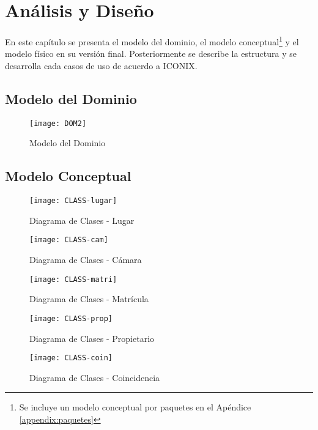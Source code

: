 \chapter{Análisis y Diseño}
En este capítulo se presenta el modelo del dominio, el modelo conceptual\footnote{Se incluye un modelo conceptual por paquetes en el Apéndice \ref{appendix:paquetes}} y el modelo físico en su versión final. Posteriormente se describe la estructura y se desarrolla cada casos de uso de acuerdo a ICONIX.

\pagebreak
\section{Modelo del Dominio}
    \begin{figure}[H]
        \centering
        \texttt{[image: DOM2]}
        \caption{Modelo del Dominio}
        \label{fig:DOM}
    \end{figure}
\section{Modelo Conceptual}

 \begin{figure}[H]
        \centering
        \texttt{[image: CLASS-lugar]}
        \caption{Diagrama de Clases - Lugar}
        \label{fig:class-lugar}
    \end{figure}
 \begin{figure}[H]
        \centering
        \texttt{[image: CLASS-cam]}
        \caption{Diagrama de Clases - Cámara}
        \label{fig:class-camara}
    \end{figure}
 \begin{figure}[H]
        \centering
        \texttt{[image: CLASS-matri]}
        \caption{Diagrama de Clases - Matrícula}
        \label{fig:class-matricula}
    \end{figure}

 \begin{figure}[H]
        \centering
        \texttt{[image: CLASS-prop]}
        \caption{Diagrama de Clases - Propietario}
        \label{fig:class-propietario}
    \end{figure}
    
     \begin{figure}[H]
        \centering
        \texttt{[image: CLASS-coin]}
        \caption{Diagrama de Clases - Coincidencia}
        \label{fig:class-coincidencia}
    \end{figure}

